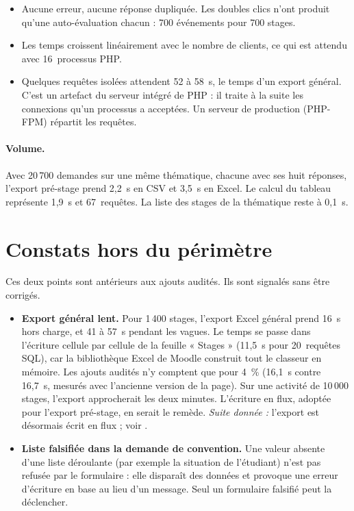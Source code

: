 \documentclass[11pt,a4paper]{article}
\begin{document}
\begin{itemize}
  \item Aucune erreur, aucune réponse dupliquée. Les doubles clics n'ont produit qu'une
    auto-évaluation chacun : 700 événements pour 700 stages.
  \item Les temps croissent linéairement avec le nombre de clients, ce qui est attendu avec
    16~processus PHP.
  \item Quelques requêtes isolées attendent 52 à 58~s, le temps d'un export général. C'est un
    artefact du serveur intégré de PHP : il traite à la suite les connexions qu'un processus a
    acceptées. Un serveur de production (PHP-FPM) répartit les requêtes.
\end{itemize}

\paragraph{Volume.} Avec 20\,700 demandes sur une même thématique, chacune avec ses huit
réponses, l'export pré-stage prend 2,2~s en CSV et 3,5~s en Excel. Le calcul du tableau
représente 1,9~s et 67~requêtes. La liste des stages de la thématique reste à 0,1~s.

\section{Constats hors du périmètre}

Ces deux points sont antérieurs aux ajouts audités. Ils sont signalés sans être corrigés.

\begin{itemize}
  \item \textbf{Export général lent.} Pour 1\,400 stages, l'export Excel général prend 16~s hors
    charge, et 41 à 57~s pendant les vagues. Le temps se passe dans l'écriture cellule par
    cellule de la feuille « Stages » (11,5~s pour 20~requêtes SQL), car la bibliothèque Excel de
    Moodle construit tout le classeur en mémoire. Les ajouts audités n'y comptent que pour 4~\%
    (16,1~s contre 16,7~s, mesurés avec l'ancienne version de la page). Sur une activité de
    10\,000 stages, l'export approcherait les deux minutes. L'écriture en flux, adoptée pour
    l'export pré-stage, en serait le remède. \emph{Suite donnée :} l'export est désormais écrit
    en flux ; voir .
  \item \textbf{Liste falsifiée dans la demande de convention.} Une valeur absente d'une liste
    déroulante (par exemple la situation de l'étudiant) n'est pas refusée par le formulaire : elle
    disparaît des données et provoque une erreur d'écriture en base au lieu d'un message. Seul un
    formulaire falsifié peut la déclencher.
\end{itemize}
\end{document}

